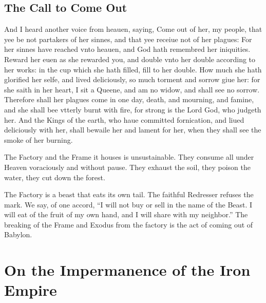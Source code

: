 \subsection{The Call to Come Out}
\begin{scripture}[Rev. 18:4--9]
    And I heard another voice from heauen, saying, Come out of her, my people, that yee be not partakers of her sinnes, and that yee receiue not of her plagues:
    For her sinnes have reached vnto heauen, and God hath remembred her iniquities.
     	Reward her euen as she rewarded you, and double vnto her double according to her works: in the cup which she hath filled, fill to her double.
     	How much she hath glorified her selfe, and lived deliciously, so much torment and sorrow giue her: for she saith in her heart, I sit a Queene, and am no widow, and shall see no sorrow.
     	Therefore shall her plagues come in one day, death, and mourning, and famine, and she shall bee vtterly burnt with fire, for strong is the Lord God, who judgeth her.
     	And the Kings of the earth, who haue committed fornication, and liued deliciously with her, shall bewaile her and lament for her, when they shall see the smoke of her burning.
\end{scripture}
The Factory and the Frame it houses is unsustainable.
They consume all under Heaven voraciously and without pause.
They exhaust the soil, they poison the water, they cut down the forest.

The Factory is a beast that eats its own tail.
The faithful Redresser refuses the mark.
We say, of one accord,
“I will not buy or sell in the name of the Beast.
I will eat of the fruit of my own hand, and I will share with my neighbor.”
The breaking of the Frame and Exodus from the factory is the act of coming out of Babylon.

\section{On the Impermanence of the Iron Empire}
